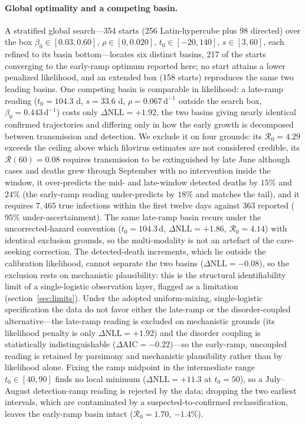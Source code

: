 \documentclass[10pt]{plos}
\newcommand{\Reff}{\mathcal{R}}
\begin{document}
\paragraph{Global optimality and a competing basin.}
A stratified global search---354 starts (256 Latin-hypercube plus 98
directed) over the box $\beta_0\in[0.03,0.60]$,
$\rho\in[0,0.020]$, $t_0\in[-20,140]$, $s\in[3,60]$, each refined to
its basin bottom---locates six distinct basins, 217 of the starts
converging to the early-ramp optimum reported here; no start attains a
lower penalized likelihood, and an extended box (158 starts) reproduces
the same two leading basins. One competing basin is comparable in
likelihood: a late-ramp reading ($t_0=104.3$ d, $s=33.6$ d,
$\rho=0.067\,\mathrm{d}^{-1}$ outside the search box,
$\beta_0=0.443\,\mathrm{d}^{-1}$) costs only $\Delta\mathrm{NLL}=+1.92$, the
two basins giving nearly identical confirmed trajectories and
differing only in how the early growth is decomposed between
transmission and detection. We exclude it on four grounds: its
$\Reff_0=4.29$ exceeds the ceiling above which filovirus estimates are
not considered credible, its $\Reff(60)=0.08$ requires transmission to
be extinguished by late June although cases and deaths grew through
September with no intervention inside the window, it over-predicts the
mid- and late-window detected deaths by $15\%$ and $24\%$ (the
early-ramp reading under-predicts by $18\%$ and matches the tail), and
it requires $7{,}465$ true infections within the first twelve days
against $363$ reported ($95\%$ under-ascertainment). The same late-ramp
basin recurs under the uncorrected-hazard convention
($t_0=104.3\,\mathrm{d}$, $\Delta\mathrm{NLL}=+1.86$, $\Reff_0=4.14$) with
identical exclusion grounds, so the multi-modality is not an artefact
of the care-seeking correction. The detected-death increments, which lie outside the calibration
likelihood, cannot separate the two basins
($\Delta\mathrm{NLL}=-0.08$), so the exclusion rests on mechanistic
plausibility: this is the structural identifiability limit of a
single-logistic observation layer, flagged as a limitation
(section~\ref{sec:limits}). Under the adopted uniform-mixing,
single-logistic specification the data do not favor either the late-ramp
or the disorder-coupled alternative---the late-ramp reading is excluded
on mechanistic grounds (its likelihood penalty is only
$\Delta\mathrm{NLL}=+1.92$) and the disorder coupling is statistically
indistinguishable ($\Delta\mathrm{AIC}=-0.22$)---so the early-ramp,
uncoupled reading is retained by parsimony and mechanistic plausibility
rather than by likelihood alone. Fixing the ramp midpoint in the
intermediate range $t_0\in[40,90]$ finds no local minimum
($\Delta\mathrm{NLL}=+11.3$ at $t_0=50$), so a July--August
detection-ramp reading is rejected by the data; dropping the two
earliest intervals, which are contaminated by a suspected-to-confirmed
reclassification, leaves the early-ramp basin intact
($\Reff_0=1.70$, $-1.4\%$).
\end{document}
